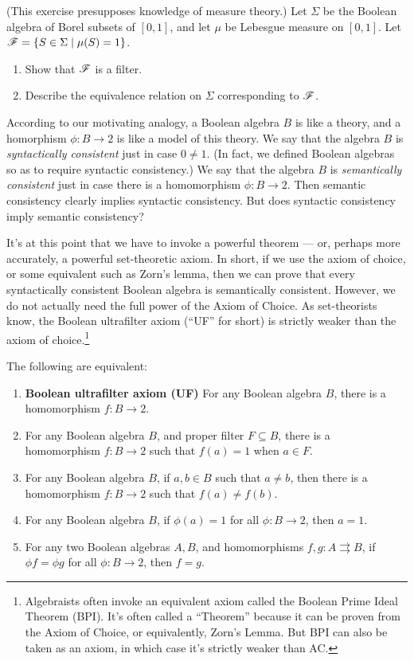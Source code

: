 \begin{exercise} (This exercise presupposes knowledge of measure
  theory.)  Let $\Sigma$ be the Boolean algebra of Borel subsets of
  $[0,1]$, and let $\mu$ be Lebesgue measure on $[0,1]$.  Let $\mathscr F=\{
  S\in \Sigma \mid \mu (S) = 1\}$.
\begin{enumerate}
\item Show that $\mathscr F$ is a filter.
\item Describe the equivalence relation on $\Sigma$ corresponding to
  $\mathscr F$.
\end{enumerate}
\end{exercise}



According to our motivating analogy, a Boolean algebra $B$ is like a
theory, and a homorphism $\phi :B\to 2$ is like a model of this
theory.  We say that the algebra $B$ is \emph{syntactically
  consistent} just in case $0\neq 1$.  (In fact, we defined Boolean
algebras so as to require syntactic consistency.)  We say that the
algebra $B$ is \emph{semantically consistent} just in case there is a
homomorphism $\phi :B\to 2$.  Then semantic consistency clearly
implies syntactic consistency.  But does syntactic consistency imply
semantic consistency?

It's at this point that we have to invoke a powerful theorem --- or,
perhaps more accurately, a powerful set-theoretic axiom.  In short, if
we use the axiom of choice, or some equivalent such as Zorn's lemma,
then we can prove that every syntactically consistent Boolean algebra
is semantically consistent.  However, we do not actually need the full
power of the Axiom of Choice.  As set-theorists know, the Boolean
ultrafilter axiom (``UF'' for short) is strictly weaker than the axiom
of choice.\footnote{Algebraists often invoke an equivalent axiom
  called the Boolean Prime Ideal Theorem (BPI).  It's often called a
  ``Theorem'' because it can be proven from the Axiom of Choice, or
  equivalently, Zorn's Lemma.  But BPI can also be taken as an axiom,
  in which case it's strictly weaker than AC.}

\begin{prop} The following are equivalent:
  \begin{enumerate}
  \item \textbf{Boolean ultrafilter axiom (UF)} For any Boolean
    algebra $B$, there is a homomorphism $f:B\to 2$.
  \item For any Boolean algebra $B$, and proper filter $F\subseteq B$,
    there is a homomorphism $f:B\to 2$ such that $f(a)=1$ when $a\in
    F$.
  \item For any Boolean algebra $B$, if $a,b\in B$ such that $a\neq
    b$, then there is a homomorphism $f:B\to 2$ such that $f(a)\neq
    f(b)$.
\item For any Boolean algebra $B$, if $\phi (a)=1$ for all $\phi :B\to
  2$, then $a=1$.
\item For any two Boolean algebras $A,B$, and homomorphisms
  $f,g:A\rightrightarrows B$, if $\phi f=\phi g$ for all $\phi :B\to
  2$, then $f=g$. 
\end{enumerate} \end{prop}

